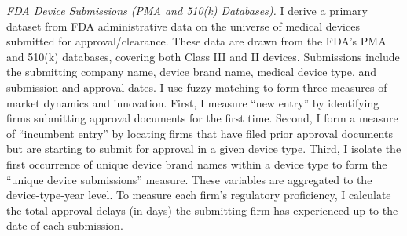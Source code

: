 \documentclass[letterpaper,12pt]{article}
\theoremstyle{definition}
\begin{document}
\textit{FDA Device Submissions (PMA and 510(k) Databases).} I derive a primary dataset from FDA administrative data on the universe of medical devices submitted for approval/clearance. These data are drawn from the FDA's PMA and 510(k) databases, covering both Class III and II devices. Submissions include the submitting company name, device brand name, medical device type, and submission and approval dates. I use fuzzy matching to form three measures of market dynamics and innovation. First, I measure ``new entry'' by identifying firms submitting approval documents for the first time. Second, I form a measure of ``incumbent entry'' by locating firms that have filed prior approval documents but are starting to submit for approval in a given device type. Third, I isolate the first occurrence of unique device brand names within a device type to form the ``unique device submissions'' measure. These variables are aggregated to the device-type-year level. To measure each firm's regulatory proficiency, I calculate the total approval delays (in days) the submitting firm has experienced up to the date of each submission. 
\end{document}
